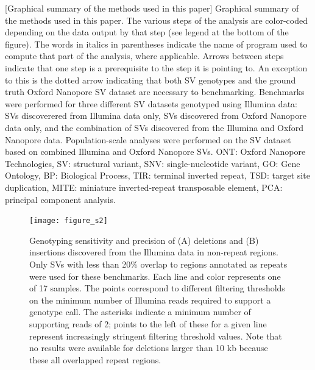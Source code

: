 \documentclass[12pt]{article}
\newenvironment{cfigure}
	{\begin{figure} \centering}
	{\end{figure}}
\begin{document}
	[Graphical summary of the methods used in this paper]{
		Graphical summary of the methods used in this paper.
		The various steps of the analysis are color-coded depending on the data output by that step (see legend at the bottom of the figure).
		The words in italics in parentheses indicate the name of program used to compute that part of the analysis, where applicable.
		Arrows between steps indicate that one step is a prerequisite to the step it is pointing to.
		An exception to this is the dotted arrow indicating that both SV genotypes and the ground truth Oxford Nanopore SV dataset are necessary to benchmarking.
		Benchmarks were performed for three different SV datasets genotyped using Illumina data: SVs discoverered from Illumina data only, SVs discovered from Oxford Nanopore data only, and the combination of SVs discovered from the Illumina and Oxford Nanopore data.
	Population-scale analyses were performed on the SV dataset based on combined Illumina and Oxford Nanopore SVs.
	ONT: Oxford Nanopore Technologies, SV: structural variant, SNV: single-nucleotide variant, GO: Gene Ontology, BP: Biological Process, TIR: terminal inverted repeat, TSD: target site duplication, MITE: miniature inverted-repeat transposable element, PCA: principal component analysis.
}

\clearpage%

\begin{cfigure}
	\texttt{[image: figure\_s2]}

	\caption[Sensitivity and precision of Illumina deletion and insertion genotyping in non-repeat regions]{
		Genotyping sensitivity and precision of (A) deletions and (B) insertions discovered from the Illumina data in non-repeat regions. 
		Only SVs with less than 20\% overlap to regions annotated as repeats were used for these benchmarks. 
		Each line and color represents one of 17 samples. 
		The points correspond to different filtering thresholds on the minimum number of Illumina reads required to support a genotype call.
		The asterisks indicate a minimum number of supporting reads of 2; points to the left of these for a given line represent increasingly stringent filtering threshold values.
		Note that no results were available for deletions larger than 10 kb because these all overlapped repeat regions.
	}

	\label{fig_s2}

\end{cfigure}
\end{document}
